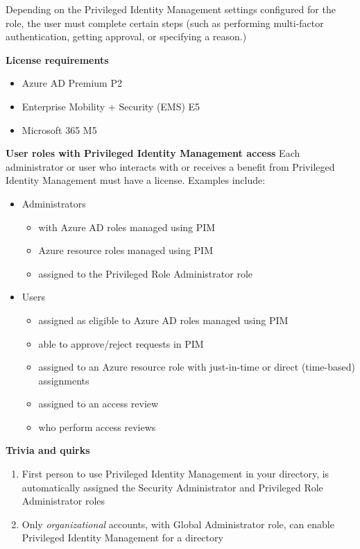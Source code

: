 Depending on the Privileged Identity Management settings configured for the role, the user must complete certain steps (such as performing multi-factor authentication, getting approval, or specifying a reason.)

\textbf{License requirements}
\begin{itemize}
\item Azure AD Premium P2
\item Enterprise Mobility + Security (EMS) E5
\item Microsoft 365 M5
\end{itemize}

\textbf{User roles with Privileged Identity Management access}
Each administrator or user who interacts with or receives a benefit from Privileged Identity Management must have a license. Examples include:
\begin{itemize}
\item Administrators
	\begin{itemize}
	\item with Azure AD roles managed using PIM
	\item Azure resource roles managed using PIM
	\item assigned to the Privileged Role Administrator role
	\end{itemize}
\item Users
	\begin{itemize}
	\item assigned as eligible to Azure AD roles managed using PIM
	\item able to approve/reject requests in PIM
	\item assigned to an Azure resource role with just-in-time or direct (time-based) assignments
	\item assigned to an access review
	\item who perform access reviews
	\end{itemize}
\end{itemize}

\textbf{Trivia and quirks} 
\begin{enumerate}
\item First person to use Privileged Identity Management in your directory, is automatically assigned the Security Administrator and Privileged Role Administrator roles
\item Only \textit{organizational} accounts, with Global Administrator role, can enable Privileged Identity Management for a directory
\end{enumerate}

